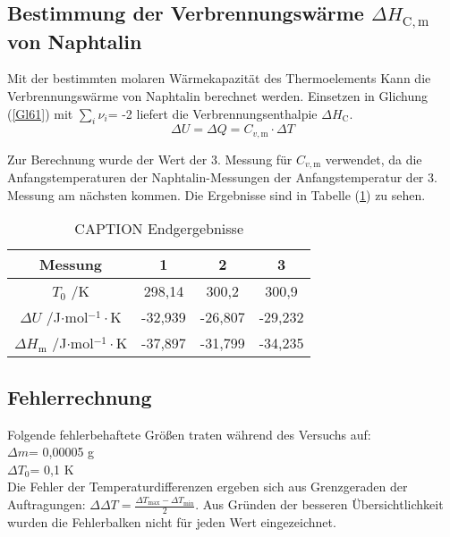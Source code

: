 \documentclass[12pt,a4paper,titlepage,headinclude,bibtotoc]{scrartcl}
\begin{document}
\subsection{Bestimmung der Verbrennungswärme $\Delta H_\mathrm{C,m}$ von Naphtalin}

Mit der bestimmten molaren Wärmekapazität des Thermoelements Kann die Verbrennungswärme von Naphtalin berechnet werden. Einsetzen in Glichung (\ref{Gl61}) mit $\sum_i \nu_i$= -2 liefert die Verbrennungsenthalpie $\Delta H_\mathrm{C}$.\\

\begin{equation}
\Delta U= \Delta Q= C_{v,\mathrm{m}}\cdot \Delta T
\end{equation}

Zur Berechnung wurde der Wert der 3. Messung für $C_{v,\mathrm{m}}$ verwendet, da die Anfangstemperaturen der Naphtalin-Messungen der Anfangstemperatur der 3. Messung am nächsten kommen. Die Ergebnisse sind in Tabelle (\ref{Endergebnisse}) zu sehen.\\

\begin{table} \caption{CAPTION Endgergebnisse} \label{Endergebnisse}
\begin{tabular}{c|c|c|c}
Messung & 1 & 2 & 3 \\ 
\hline 
$T_0$ /K &298,14&300,2&300,9\\
\hline 
$\Delta U$ /J$\cdot$mol$^{-1}\cdot$K &-32,939&-26,807&-29,232\\ 
\hline 
$\Delta H_\mathrm{m}$ /J$\cdot$mol$^{-1}\cdot$K &-37,897&-31,799&-34,235\\
\end{tabular} 
\end{table}
\FloatBarrier

\subsection{Fehlerrechnung}
Folgende fehlerbehaftete Größen traten während des Versuchs auf:\\
 $\Delta m$= 0,00005 g\\
 $\Delta T_0$= 0,1 K\\
 
Die Fehler der Temperaturdifferenzen ergeben sich aus Grenzgeraden der Auftragungen: $\Delta \Delta T= \frac{\Delta T_\mathrm{max}-\Delta T_\mathrm{min}}{2} $. Aus Gründen der besseren Übersichtlichkeit wurden die Fehlerbalken nicht für jeden Wert eingezeichnet.\\
\end{document}
